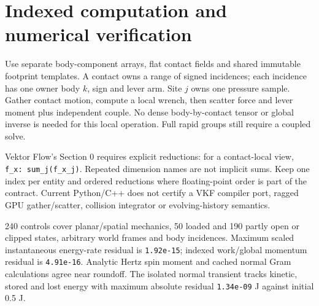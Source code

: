 \documentclass[10pt,a4paper]{article}
\begin{document}
\newpage
\section*{Indexed computation and numerical verification}
Use separate body-component arrays, flat contact fields and shared immutable
footprint templates. A contact owns a range of signed incidences; each incidence
has one owner body $k$, sign and lever arm. Site $j$ owns one pressure sample.
Gather contact motion, compute a local wrench, then scatter force and lever moment
plus independent couple. No dense body-by-contact tensor or global inverse is
needed for this local operation. Full rapid groups still require a coupled solve.

Vektor Flow's Section 0 requires explicit reductions: for a contact-local view,
\texttt{f\_x: sum\_j(f\_x\_j)}. Repeated dimension names are not implicit sums.
Keep one index per entity and ordered reductions where floating-point order is
part of the contract. Current Python/C++ does not certify a VKF compiler port,
ragged GPU gather/scatter, collision integrator or evolving-history semantics.

240 controls cover planar/spatial mechanics, 50 loaded and 190 partly open or
clipped states, arbitrary world frames and body incidences. Maximum scaled
instantaneous energy-rate residual is \texttt{1.92e-15}; indexed work/global
momentum residual is \texttt{4.91e-16}. Analytic Hertz spin moment and cached
normal Gram calculations agree near roundoff. The isolated normal transient
tracks kinetic, stored and lost energy with maximum absolute residual
\texttt{1.34e-09} J against initial 0.5 J.
\end{document}
